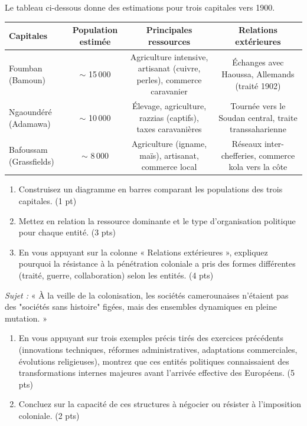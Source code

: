 \documentclass[11pt]{article}
\begin{document}
\begin{exercice}
Le tableau ci-dessous donne des estimations pour trois capitales vers 1900.
\begin{center}
\begin{tabular}{|l|c|c|c|}
\hline
\textbf{Capitales} & \textbf{Population estimée} & \textbf{Principales ressources} & \textbf{Relations extérieures} \\
\hline
Foumban (Bamoun) & $\sim$ 15\,000 & Agriculture intensive, artisanat (cuivre, perles), commerce caravanier & Échanges avec Haoussa, Allemands (traité 1902) \\
\hline
Ngaoundéré (Adamawa) & $\sim$ 10\,000 & Élevage, agriculture, razzias (captifs), taxes caravanières & Tournée vers le Soudan central, traite transsaharienne \\
\hline
Bafoussam (Grassfields) & $\sim$ 8\,000 & Agriculture (igname, maïs), artisanat, commerce local & Réseaux inter-chefferies, commerce kola vers la côte \\
\hline
\end{tabular}
\end{center}
\begin{enumerate}
    \item Construisez un diagramme en barres comparant les populations des trois capitales. (1 pt)
    \item Mettez en relation la ressource dominante et le type d'organisation politique pour chaque entité. (3 pts)
    \item En vous appuyant sur la colonne « Relations extérieures », expliquez pourquoi la résistance à la pénétration coloniale a pris des formes différentes (traité, guerre, collaboration) selon les entités. (4 pts)
\end{enumerate}
\end{exercice}

\begin{exercice}
\textit{Sujet :} « À la veille de la colonisation, les sociétés camerounaises n'étaient pas des "sociétés sans histoire" figées, mais des ensembles dynamiques en pleine mutation. »
\begin{enumerate}
    \item En vous appuyant sur trois exemples précis tirés des exercices précédents (innovations techniques, réformes administratives, adaptations commerciales, évolutions religieuses), montrez que ces entités politiques connaissaient des transformations internes majeures avant l'arrivée effective des Européens. (5 pts)
    \item Concluez sur la capacité de ces structures à négocier ou résister à l'imposition coloniale. (2 pts)
\end{enumerate}
\end{exercice}
\end{document}
